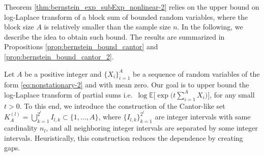 \documentclass[11pt]{article}
\theoremstyle{plain}
\theoremstyle{definition}
\begin{document}
Theorem \ref{thm:bernstein_exp_subExp_nonlinear-2} relies on the upper bound on log-Laplace transform of a block sum of bounded random variables, where the block size $A$ is relatively smaller than the sample size $n$. In the following, we describe the idea to obtain such bound. The results are summarized in Propositions \ref{prop:bernstein_bound_cantor} and \ref{prop:bernstein_bound_cantor_2}.


Let $A$ be a positive integer and $\{X_i\}_{i = 1}^A$ be a sequence of random variables of the form \eqref{eq:nonstationary-2} and with mean zero.
Our goal is to upper bound the log-Laplace transform of partial sums i.e.~$\log\mathbb{E}\big[\exp\big(t\sum_{i = 1}^AX_i\big)\big]$, for any small $t > 0$. To this end, we introduce the construction of the Cantor-like set $K_A^{(l)} = \bigcup_{k=1}^{2^l} I_{l,k} \subset \{1, \dots, A\}$, where $\{I_{l,k}\}_{k = 1}^{2^l}$ are integer intervals with same cardinality $n_l$, and all neighboring integer intervals are separated by some integer intervals. Heuristically, this construction reduces the dependence by creating gaps.
\end{document}

